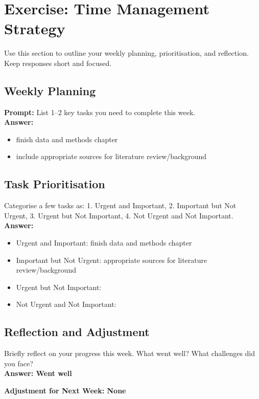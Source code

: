 \documentclass[a4paper,12pt]{article}
\begin{document}
\section{Exercise: Time Management Strategy}
Use this section to outline your weekly planning, prioritisation, and reflection. Keep responses short and focused.

\subsection*{Weekly Planning}
\textbf{Prompt:} List 1–2 key tasks you need to complete this week.\\
\textbf{Answer:}
\begin{itemize}
    \item finish data and methods chapter
    \item include appropriate sources for literature review/background
\end{itemize}

\subsection*{Task Prioritisation}
 Categorise a few tasks as: 1. Urgent and Important, 2. Important but Not Urgent, 3. Urgent but Not Important, 4. Not Urgent and Not Important.\\
\textbf{Answer:}
\begin{itemize}
    \item Urgent and Important: finish data and methods chapter
    \item Important but Not Urgent: appropriate sources for literature review/background
    \item Urgent but Not Important: 
    \item Not Urgent and Not Important: 
\end{itemize}

\subsection*{Reflection and Adjustment}
Briefly reflect on your progress this week. What went well? What challenges did you face?\\
\textbf{Answer: Went well} 

\noindent
\textbf{Adjustment for Next Week: None} 
\end{document}
